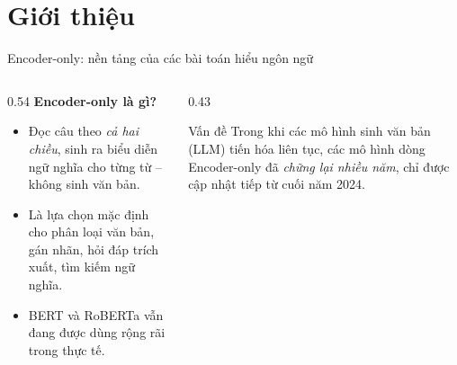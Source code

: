 \section{Giới thiệu}

\begin{frame}{Encoder-only: nền tảng của các bài toán hiểu ngôn ngữ}
\vspace{0.2em}
\begin{columns}[T]
\begin{column}{0.54\textwidth}
  \textbf{Encoder-only là gì?}
  \begin{itemize}\itemsep3pt
    \item Đọc câu theo \emph{cả hai chiều}, sinh ra biểu diễn ngữ nghĩa
          cho từng từ -- không sinh văn bản.
    \item Là lựa chọn mặc định cho phân loại văn bản, gán nhãn, hỏi đáp
          trích xuất, tìm kiếm ngữ nghĩa.
    \item BERT và RoBERTa vẫn đang được dùng rộng rãi trong thực tế.
  \end{itemize}
\end{column}

\begin{column}{0.43\textwidth}
  \begin{block}{Vấn đề}
    Trong khi các mô hình sinh văn bản (LLM) tiến hóa liên tục, các mô
    hình dòng Encoder-only đã \emph{chững lại nhiều năm}, chỉ được cập
    nhật tiếp từ cuối năm 2024.
  \end{block}
\end{column}
\end{columns}

\vspace{0.5em}
\centering
\end{frame}
